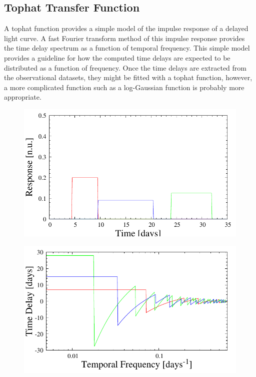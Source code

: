 \documentclass[11pt,letterpaper]{article}
\begin{document}
    \subsection{Tophat Transfer Function}

	A tophat function provides a simple model of the impulse response of a delayed light curve. A fast Fourier transform method of this impulse response provides the time delay spectrum as a function of temporal frequency. This simple model provides a guideline for how the computed time delays are expected to be distributed as a function of frequency. Once the time delays are extracted from the observational datasets, they might be fitted with a tophat function, however, a more complicated function such as a log-Gaussian function is probably more appropriate.

    \begin{figure}
        \centering
        \begin{minipage}{.475\textwidth}
            \centering
            \includegraphics[width=1\linewidth]{../img/tophat_timedomain.pdf}
            \label{fig:th_time}
        \end{minipage}
        \hfill
        \begin{minipage}{.475\textwidth}
            \centering
            \includegraphics[width=1\linewidth]{../img/tophat_freqdomain.pdf}

\end{minipage}
\end{figure}
\end{document}

